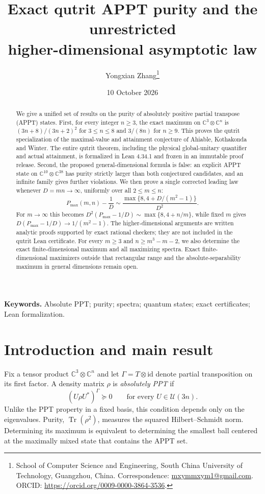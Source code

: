 \documentclass[11pt]{article}
\title{Exact qutrit APPT purity and the unrestricted\protect\\higher-dimensional asymptotic law}
\author{Yongxian Zhang\thanks{School of Computer Science and Engineering, South China University of Technology, Guangzhou, China. Correspondence: \href{mailto:mxymmxym1@gmail.com}{mxymmxym1@gmail.com}. ORCID: \url{https://orcid.org/0009-0000-3864-3536}.}}
\date{10 October 2026}
\theoremstyle{remark}\newtheorem{remark}[theorem]{Remark}
\newcommand{\Tr}{\operatorname{Tr}}
\newcommand{\id}{\mathrm{id}}
\newcommand{\C}{\mathbb C}
\begin{document}
\maketitle
\begin{abstract}
We give a unified set of results on the purity of absolutely positive partial transpose (APPT) states. First, for every integer $n\geq3$, the exact maximum on $\C^3\otimes\C^n$ is $(3n+8)/(3n+2)^2$ for $3\leq n\leq8$ and $3/(8n)$ for $n\geq9$. This proves the qutrit specialization of the maximal-value and attainment conjecture of Ahiable, Kothakonda and Winter. The entire qutrit theorem, including the physical global-unitary quantifier and actual attainment, is formalized in Lean 4.34.1 and frozen in an immutable proof release. Second, the proposed general-dimensional formula is false: an explicit APPT state on $\C^{10}\otimes\C^{38}$ has purity strictly larger than both conjectured candidates, and an infinite family gives further violations. We then prove a single corrected leading law whenever $D=mn\to\infty$, uniformly over all $2\leq m\leq n$:\[ P_{\max}(m,n)-\frac1D\sim\frac{\max\{8,4+D/(m^2-1)\}}{D^2}.\] For $m\to\infty$ this becomes $D^2(P_{\max}-1/D)\sim\max\{8,4+n/m\}$, while fixed $m$ gives $D(P_{\max}-1/D)\to1/(m^2-1)$. The higher-dimensional arguments are written analytic proofs supported by exact rational checkers; they are not included in the qutrit Lean certificate. For every $m\geq3$ and $n\geq m^3-m-2$, we also determine the exact finite-dimensional maximum and all maximizing spectra. Exact finite-dimensional maximizers outside that rectangular range and the absolute-separability maximum in general dimensions remain open.
\end{abstract}
\noindent\textbf{Keywords.} Absolute PPT; purity; spectra; quantum states; exact certificates; Lean formalization.

\section{Introduction and main result}
Fix a tensor product $\C^3\otimes\C^n$ and let $\Gamma=T\otimes\id$ denote partial transposition on its first factor. A density matrix $\rho$ is \emph{absolutely PPT} if
\begin{equation}\label{eq:appt}
 (U\rho U^*)^\Gamma\succeq0\qquad\text{for every }U\in\mathcal U(3n).
\end{equation}
Unlike the PPT property in a fixed basis, this condition depends only on the eigenvalues. Purity, $\Tr(\rho^2)$, measures the squared Hilbert--Schmidt norm. Determining its maximum is equivalent to determining the smallest ball centered at the maximally mixed state that contains the APPT set.
\end{document}
